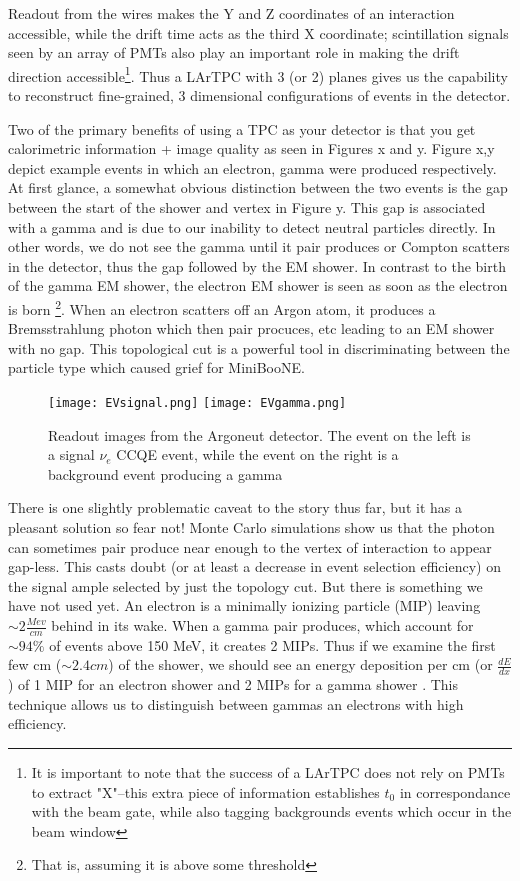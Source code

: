 \documentclass[12pt]{article}
\begin{document}
Readout from the wires makes the Y and Z coordinates of an interaction accessible, while the drift time acts as the third X coordinate; scintillation signals seen by an array of PMTs also play an important role in making the drift direction accessible\footnote{It is important to note that the success of a LArTPC does not rely on PMTs to extract "X"--this extra piece of information establishes $t_0$ in correspondance with the beam gate, while also tagging backgrounds events which occur in the beam window}.  Thus a LArTPC with 3 (or 2) planes gives us the capability to reconstruct fine-grained, 3 dimensional configurations of events in the detector. \vspace{4 mm}
\par Two of the primary benefits of using a TPC as your detector is that you get calorimetric information + image quality as seen in Figures x and y.  Figure x,y depict example events in which an electron, gamma were produced respectively. At first glance, a somewhat obvious distinction between the two events is the gap between the start of the shower and vertex in Figure y.  This gap is associated with a gamma and is due to our inability to detect neutral particles directly. In other words, we do not see the gamma until it pair produces or Compton scatters in the detector, thus the gap followed by the EM shower. In contrast to the birth of the gamma EM shower, the electron EM shower is seen as soon as the electron is born \footnote{That is, assuming it is above some threshold}.  When an electron scatters off an Argon atom, it produces a Bremsstrahlung photon which then pair procuces, etc leading to an EM shower with no gap. This topological cut is a powerful tool in discriminating between the particle type which caused grief for MiniBooNE. 
\begin{figure}[h!]
\texttt{[image: EVsignal.png]}
\hspace{2 mm}
\texttt{[image: EVgamma.png]}
\caption{Readout images from the Argoneut detector. The event on the left is a signal $\nu_e$ CCQE event, while the event on the right is a background event producing a gamma} 
\end{figure}
\vspace{4 mm} \par There is one slightly problematic caveat to the story thus far, but it has a pleasant solution so fear not! Monte Carlo simulations show us that the photon can sometimes pair produce near enough to the vertex of interaction to appear gap-less. This casts doubt (or at least a decrease in event selection efficiency) on the signal ample selected by just the topology cut. But there is something we have not used yet.  An electron is a minimally ionizing particle (MIP) leaving $\sim 2 \frac{Mev}{cm}$ behind in its wake. When a gamma pair produces, which account for $\sim 94\%$ of events above 150 MeV, it creates 2 MIPs.  Thus if we examine the first few cm ($\sim 2.4cm$) of the shower, we should see an energy deposition per cm (or $\frac{dE}{dx}$) of 1 MIP for an electron shower and 2 MIPs for a gamma shower \cite{szelc}. This technique allows us to distinguish between gammas an electrons with high efficiency.    
\end{document}
